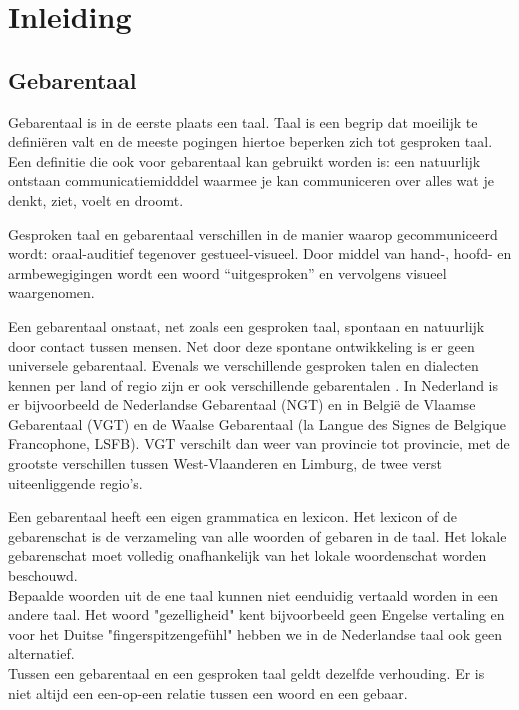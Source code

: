 \chapter{Inleiding}
\section{Gebarentaal}

Gebarentaal is in de eerste plaats een taal. Taal is een begrip dat moeilijk te defini\"eren valt en de meeste pogingen hiertoe beperken zich tot gesproken taal. Een definitie die ook voor gebarentaal kan gebruikt worden is: een natuurlijk ontstaan communicatiemidddel waarmee je kan communiceren over alles wat je denkt, ziet, voelt en droomt. \cite{bron}

\npar Gesproken taal en gebarentaal verschillen in de manier waarop gecommuniceerd wordt: oraal-auditief tegenover gestueel-visueel. Door middel van hand-, hoofd- en armbewegigingen wordt een woord ``uitgesproken'' en vervolgens visueel waargenomen.

\npar Een gebarentaal onstaat, net zoals een gesproken taal, spontaan en natuurlijk door contact tussen mensen. Net door deze spontane ontwikkeling is er geen universele gebarentaal. Evenals we verschillende gesproken talen en dialecten kennen per land of regio zijn er ook verschillende gebarentalen \cite{VGT-standard}. In Nederland is er bijvoorbeeld de Nederlandse Gebarentaal (NGT) en in Belgi\"e de Vlaamse Gebarentaal (VGT) en de Waalse Gebarentaal (la Langue des Signes de Belgique Francophone, LSFB). VGT verschilt dan weer van provincie tot provincie, met de grootste verschillen tussen West-Vlaanderen en Limburg, de twee verst uiteenliggende regio's.

\npar Een gebarentaal heeft een eigen grammatica en lexicon. Het lexicon of de gebarenschat is de verzameling van alle woorden of gebaren in de taal. Het lokale gebarenschat moet volledig onafhankelijk van het lokale woordenschat worden beschouwd.
\\Bepaalde woorden uit de ene taal kunnen niet eenduidig vertaald worden in een andere taal. Het woord "gezelligheid" kent bijvoorbeeld geen Engelse vertaling en voor het Duitse "fingerspitzengef\"uhl" hebben we in de Nederlandse taal ook geen alternatief.
\\Tussen een gebarentaal en een gesproken taal geldt dezelfde verhouding. Er is niet altijd een een-op-een relatie tussen een woord en een gebaar.

